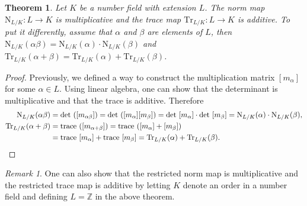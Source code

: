 \documentclass[openany, a4paper, 10pt]{book}
\theoremstyle{plain}
\newtheorem{theorem}{Theorem}[chapter]
\theoremstyle{plain}
\theoremstyle{plain}
\theoremstyle{definition}
\theoremstyle{plain}
\theoremstyle{definition}
\theoremstyle{remark}
\newtheorem*{remark}{Remark}
\begin{document}
\begin{theorem}
    Let $K$ be a number field with extension $L$.
    The norm map $\mathrm N_{L/K} : L \to K$ is multiplicative and the trace map $\mathrm {Tr}_{L/K}: L \to K$ is additive.
    To put it differently, assume that $\alpha$ and $\beta$ are elements of $L$, then $\mathrm N_{L/K}(\alpha \beta) = \mathrm N_{L/K}(\alpha) \cdot \mathrm N_{L/K}(\beta)$ and $\mathrm{Tr}_{L/K}(\alpha + \beta) = \mathrm{Tr}_{L/K}(\alpha) + \mathrm{Tr}_{L/K}(\beta)$.
\end{theorem}
\begin{proof}
    Previously, we defined a way to construct the multiplication matrix $[m_\alpha]$ for some $\alpha \in L$.
    Using linear algebra, one can show that the determinant is multiplicative \cite[Theorem~9.49]{axler_det} and that the trace is additive.
    Therefore
    \begin{align*}
        \mathrm{N}_{L/K}(\alpha\beta)   &= \det\ ([m_{\alpha \beta}]) = \det\ ([m_\alpha][m_\beta]) = \det\ [m_\alpha] \cdot \det\ [m_\beta] = \mathrm N_{L/K}(\alpha) \cdot \mathrm N_{L/K}(\beta), \\
        \mathrm{Tr}_{L/K}(\alpha+\beta) &= \textrm{trace}\ ([m_{\alpha+\beta}]) = \textrm{trace}\ ([m_\alpha]+[m_\beta]) \\
                                        &= \textrm{trace}\ [m_\alpha] + \textrm{trace}\ [m_\beta] = \mathrm {Tr}_{L/K}(\alpha) + \mathrm {Tr}_{L/K}(\beta).\qedhere
    \end{align*}
\end{proof}
\begin{remark}
    One can also show that the restricted norm map is multiplicative and the restricted trace map is additive by letting $K$ denote an order in a number field and defining $L = \mathbb Z$ in the above theorem.
\end{remark}
\end{document}
